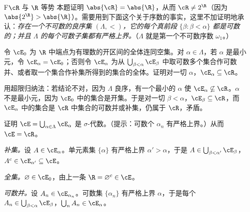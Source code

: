 
\begin{probleme}{F}{$\cR$ 与 $\R$ 等势}
本题证明 $\abs{\cR}=\abs{\R}$，从而 $\cR\neq2^\R$（因为 $\abs{2^\R}>\abs{\R}$）。需要用到下面这个关于序数的事实，这里不加证明地承认：\emph{存在一个不可数的良序集 $(\Lambda,<)$，它的每个真前段 $\{\beta:\beta<\alpha\}$ 都是可数的；并且 $\Lambda$ 的每个可数子集都有严格上界。}（$\Lambda$ 就是第一个不可数序数 $\omega_1$。）
\begin{questions}
\item 令 $\cE_0$ 为 $\R$ 中端点为有理数的开区间的全体连同空集。对 $\alpha\in\Lambda$，若 $\alpha$ 是最小元，令 $\cE_\alpha=\cE_0$；否则令 $\cE_\alpha$ 为从 $\bigcup_{\beta<\alpha}\cE_\beta$ 中取可数多个集合作可数并、或者取一个集合作补集所得到的集合的全体。证明对一切 $\alpha$，$\cE_\alpha\subseteq\cR$。
\begin{solution}
用超限归纳法：若结论不对，因为 $\Lambda$ 良序，有一个最小的 $\alpha$ 使 $\cE_\alpha\not\subseteq\cR$。$\alpha$ 不是最小元，因为 $\cE_0$ 中的集合是开集。于是对一切 $\beta<\alpha$，$\cE_\beta\subseteq\cR$，而 $\cE_\alpha$ 中的集合是 $\cR$ 中集合的可数并或补集，仍属于 $\cR$，矛盾。
\end{solution}
\item 证明 $\cE=\bigcup_{\alpha\in\Lambda}\cE_\alpha$ 是 $\sigma$-代数。（提示：可数个 $\alpha_n$ 有严格上界。）从而 $\cE=\cR$。
\begin{solution}
\emph{补集。}设 $A\in\cE_\alpha$。单元素集 $\{\alpha\}$ 有严格上界 $\alpha'>\alpha$，于是 $A\in\bigcup_{\beta<\alpha'}\cE_\beta$，$A^c\in\cE_{\alpha'}\subseteq\cE$。

\emph{全集。}$\varnothing\in\cE_0$，由上一条 $\R=\varnothing^c\in\cE$。

\emph{可数并。}设 $A_n\in\cE_{\alpha_n}$。可数集 $\{\alpha_n\}$ 有严格上界 $\alpha$，于是每个 $A_n\in\bigcup_{\beta<\alpha}\cE_\beta$，$\bigcup_nA_n\in\cE_\alpha$。


\end{solution}
\end{questions}
\end{probleme}
